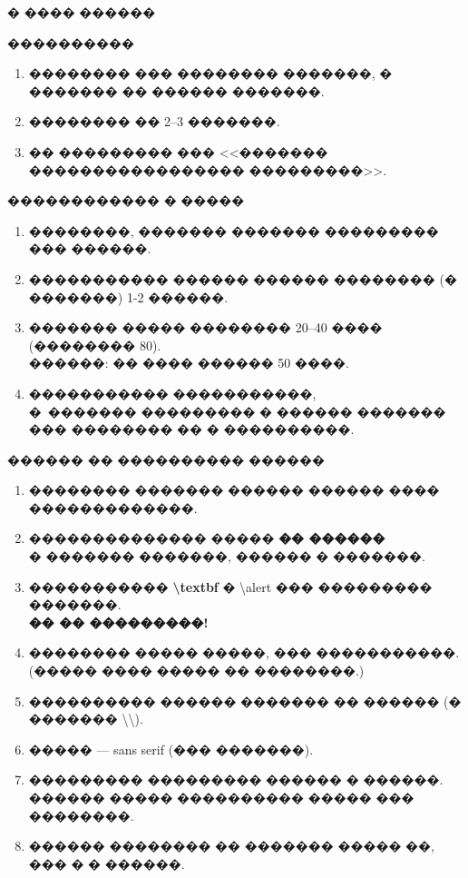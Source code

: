 \documentclass[fullscreen=true,russian,compress,%
	hyperref={unicode,bookmarks=false}]{presentation}
\begin{document}
\begin{frame}{� ���� ������}
\begin{block}{����������}
	\begin{enumerate}
		\item �������� ��� �������� �������, � ������� �� ������ �������.
		\item �������� �� 2--3 �������.
		\item �� ��������� ��� <<������� ����������������� ���������>>.
	\end{enumerate}
\end{block}

\begin{block}{������������ � �����}
	\begin{enumerate}
		\item ��������, ������� ������� ��������� ��� ������.
		\item ����������� ������ ������ �������� (� �������) 1-2 ������.
		\item ������� ����� �������� 20--40 ���� (�������� 80).\\ 
		������: �� ���� ������ 50 ����.
		\item ����������� �����������, \\
		�~������� ��������� � ������ ������� \\
		��� �������� �� � ����������. \ 
		\label{labstr}\hyperlink{example}{}
	\end{enumerate}
\end{block}

\end{frame}

\begin{frame}{������ �� ���������� ������}
	\begin{enumerate}
		\item �������� ������� ������ ������ ���� �������������.
		\item �������������� ����� \textbf{�� ������}\\ 
		� ������� �������, ������ � �������.    
		\item ����������� \textbf{\textbackslash{}textbf} � \alert{\textbackslash{}alert}
		��� ��������� �������.\\
		\textbf{�� �� ���������!}
		\item �������� ����� �����, ��� �����������.\\
		(����� ���� ����� �� ��������.)
		\item ���������� ������ ������� �� ������ (� ������� \textbackslash\textbackslash).  
		\item ����� --- sans serif (��� �������).
		\item ��������� ��������� ������ � ������.\\
		������ ����� ���������� ����� ��� ��������.
		\item ������ �������� �� ������� ����� ��, ��� � � ������.
	\end{enumerate}
\end{frame}
\end{document}
